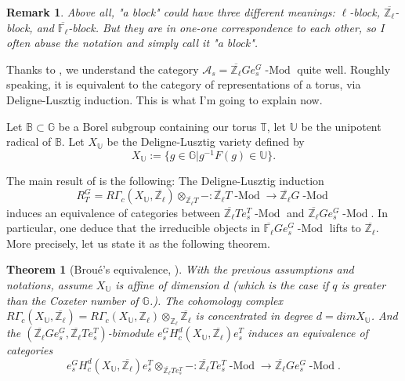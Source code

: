 \documentclass{article}
\newtheorem*{remark}{Remark}
\newtheorem{theorem}{Theorem}
\newcommand{\Modl}{\operatorname{-Mod}}
\begin{document}
	\begin{remark}
		Above all, "a block" could have three different meanings: $\ell$-block, $\overline{\mathbb{Z}_{\ell}}$-block, and $\overline{\mathbb{F}_{\ell}}$-block. But they are in one-one correspondence to each other, so I often abuse the notation and simply call it "a block".
	\end{remark}
	
	Thanks to \cite{broue1990isometries}, we understand the category $\mathcal{A}_s=\overline{\mathbb{Z}_\ell}Ge_s^G\Modl$ quite well. Roughly speaking, it is equivalent to the category of representations of a torus, via Deligne-Lusztig induction. This is what I'm going to explain now.
	
	Let $\mathbb{B} \subset \mathbb{G}$ be a Borel subgroup containing our torus $\mathbb{T}$, let $\mathbb{U}$ be the unipotent radical of $\mathbb{B}$. Let $X_{\mathbb{U}}$ be the Deligne-Lusztig variety defined by
	$$X_{\mathbb{U}}:=\{g \in \mathbb{G} | g^{-1}F(g) \in \mathbb{U}\}.$$
	
	The main result of \cite{broue1990isometries} is the following: The Deligne-Lusztig induction 
	$$R_T^G=R\Gamma_c(X_{\mathbb{U}}, \overline{\mathbb{Z}_\ell})\otimes_{\overline{\mathbb{Z}_\ell}T}-: \overline{\mathbb{Z}_\ell}T\Modl \to \overline{\mathbb{Z}_\ell}G\Modl$$ induces an equivalence of categories between $\overline{\mathbb{Z}_\ell}Te_s^T\Modl$ and $\overline{\mathbb{Z}_\ell}Ge_s^G\Modl$. In particular, one deduce that the irreducible objects in $\overline{\mathbb{F}_\ell}Ge_s^G\Modl$ lifts to $\overline{\mathbb{Z}_\ell}$. More precisely, let us state it as the following theorem.
	
	\begin{theorem}[Broué's equivalence, {\cite[Theorem 3.3]{broue1990isometries}}]\label{Thm Broue}
		With the previous assumptions and notations, assume $X_{\mathbb{U}}$ is affine of dimension $d$ (which is the case if $q$ is greater than the Coxeter number of $\mathbb{G}$.). The cohomology complex $R\Gamma_c(X_{\mathbb{U}}, \overline{\mathbb{Z}_\ell})=R\Gamma_c(X_{\mathbb{U}}, {\mathbb{Z}_\ell}) \otimes_{\mathbb{Z}_\ell}$$\overline{\mathbb{Z}_\ell}$ is concentrated in degree $d=dimX_{\mathbb{U}}$. And the $(\overline{\mathbb{Z}_\ell}Ge_s^G, \overline{\mathbb{Z}_\ell}Te_s^T)$-bimodule $e_s^GH_c^d(X_{\mathbb{U}}, \overline{\mathbb{Z}_\ell})e_s^T$ induces an equivalence of categories
		$$e_s^GH_c^d(X_{\mathbb{U}}, \overline{\mathbb{Z}_\ell})e_s^T \otimes_{\overline{\mathbb{Z}_\ell}Te_s^T}-: \overline{\mathbb{Z}_\ell}Te_s^T\Modl \to \overline{\mathbb{Z}_\ell}Ge_s^G\Modl.$$
	\end{theorem}
	
\end{document}
